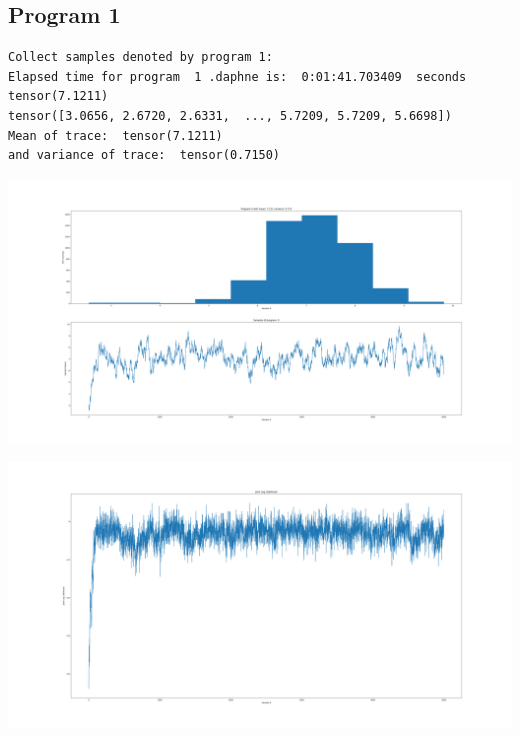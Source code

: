 \documentclass[]{article}
\begin{document}
\subsection{Program 1}
\begin{verbatim}
Collect samples denoted by program 1:
Elapsed time for program  1 .daphne is:  0:01:41.703409  seconds
tensor(7.1211)
tensor([3.0656, 2.6720, 2.6331,  ..., 5.7209, 5.7209, 5.6698])
Mean of trace:  tensor(7.1211)  
and variance of trace:  tensor(0.7150)
\end{verbatim}
\begin{center}
	\includegraphics[width=\linewidth]{Figures/p1_HMC.png}
\end{center}
\begin{center}
	\includegraphics[width=\linewidth]{Figures/p1_HMCjll.png}
\end{center}
\end{document}
